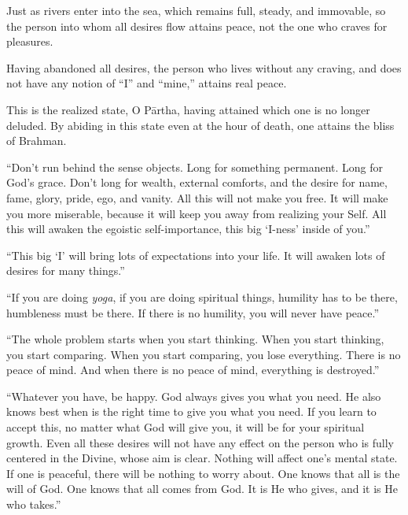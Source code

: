{Just as rivers enter into the sea, which remains full, steady, and immovable, so the person into whom all desires flow attains peace, not the one who craves for pleasures.}

{Having abandoned all desires, the person who lives without any craving, and does not have any notion of \enquote{I} and \enquote{mine,} attains real peace.}

{This is the realized state, O Pārtha, having attained which one is no longer deluded. By abiding in this state even at the hour of death, one attains the bliss of Brahman.}

\enquote{Don’t run behind the sense objects. Long for something permanent. Long for God’s grace. Don’t long for wealth, external comforts, and the desire for name, fame, glory, pride, ego, and vanity. All this will not make you free. It will make you more miserable, because it will keep you away from realizing your Self. All this will awaken the egoistic self-importance, this big \enquote{I-ness} inside of you.}

\enquote{This big \enquote{I} will bring lots of expectations into your life. It will awaken lots of desires for many things.}

\enquote{If you are doing \textit{yoga}, if you are doing spiritual things, humility has to be there, humbleness must be there. If there is no humility, you will never have peace.}

\enquote{The whole problem starts when you start thinking. When you start thinking, you start comparing. When you start comparing, you lose everything. There is no peace of mind. And when there is no peace of mind, everything is destroyed.}

\enquote{Whatever you have, be happy. God always gives you what you need. He also knows best when is the right time to give you what you need. If you learn to accept this, no matter what God will give you, it will be for your spiritual growth. Even all these desires will not have any effect on the person who is fully centered in the Divine, whose aim is clear. Nothing will affect one’s mental state. If one is peaceful, there will be nothing to worry about. One knows that all is the will of God. One knows that all comes from God. It is He who gives, and it is He who takes.}

